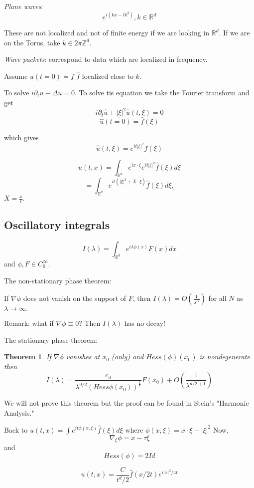 \documentclass[11pt]{amsart}
\theoremstyle{plain}
\numberwithin{equation}{section}
\newtheorem{thm}{Theorem}[section]
\theoremstyle{remark}
\newcommand{\R}{\mathbb{R}}
\begin{document}
\emph{Plane waves}: $$e^{i (kx-tk^2)}, k \in \R^d$$

These are not localized and not of finite energy if we are looking in $\R^d.$ If we are on the Torus, take $k\in 2\pi \mathbb{Z}^d.$

\emph{Wave packets}: correspond to data which are localized in frequency. 

Assume $u(t=0)=f$ $\hat{f}$ localized close to $k.$

To solve $i\partial_{t} u -\Delta u=0.$ To solve tis equation we take the Fourier transform and get $$i\partial_{t} \hat{u} + |\xi|^2 \hat{u}(t,\xi)=0$$
$$\hat{u}(t=0)=\hat{f}(\xi)$$

which gives $$\hat{u}(t,\xi)=e^{it|\xi|^2}\hat{f}(\xi)$$

$$u(t,x)= \int_{\R^d} e^{ix\cdot \xi} e^{it|\xi|^2} \hat{f}(\xi) d\xi$$
$$ =\int_{\R^d} e^{it(|\xi|^2+X\cdot \xi)} \hat{f}(\xi) d\xi,$$ $X=\frac{x}{t}.$

\subsection{Oscillatory integrals}

$$I(\lambda) =  \int_{\R^d} e^{i\lambda \phi(x)} F(x) dx$$
and $\phi, F\in C^{\infty}_0.$

The non-stationary phase theorem:

If $\nabla \phi$ does not vanish on the support of $F$, then $I(\lambda)= O(\frac{1}{\lambda^N})$ for all $N$ as $\lambda\rightarrow \infty.$ 

Remark: what if $\nabla \phi \equiv 0$? Then $I(\lambda)$ has no decay!

The stationary phase theorem:

\begin{thm}

If $\nabla \phi$ vanishes at $x_0$ (only) and $Hess(\phi)(x_0)$ is nondegenerate then $$I(\lambda)=\frac{c_d}{\lambda^{d/2} (Hess \phi (x_0))^\frac{1}{2}}F(x_0) + O(\frac{1}{\lambda^{d/2+1}}) $$

\end{thm}


We will not prove this theorem but the proof can be found in Stein's "Harmonic Analysis."

Back to $u(t,x) = \int e^{it \phi(x,\xi)} \hat{f} (\xi) d\xi $
where $\phi(x,\xi)=x\cdot \xi - |\xi|^2$
Now, $$\nabla_{\xi}\phi= x-\tau\xi$$ and $$ Hess (\phi) = 2 Id$$

$$u(t,x) = \frac{C}{t^d/2} \hat{f}(x/2t) e^{i|x|^2 /4t}$$
 
\end{document}
